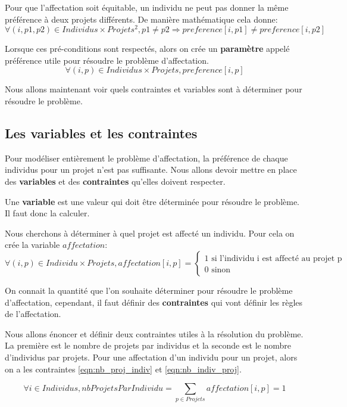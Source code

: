 \documentclass[final,poster]{polytech/polytech}
\begin{document}
Pour que l'affectation soit équitable, un individu ne peut pas donner la même préférence à deux projets différents. De manière mathématique cela donne:
$$
\forall (i,p1,p2) \in Individus \times Projets^2 , p1 \neq p2 \Rightarrow preference[i,p1] \neq preference[i,p2]
$$

Lorsque ces pré-conditions sont respectés, alors on crée un \textbf{paramètre} appelé préférence utile pour résoudre le problème d'affectation.
$$
\forall (i,p) \in Individus \times Projets,
preference[i,p]
$$

Nous allons maintenant voir quels contraintes et variables sont à déterminer pour résoudre le problème.

\subsection{Les variables et les contraintes}

Pour modéliser entièrement le problème d'affectation, la préférence de chaque individus pour un projet n'est pas suffisante.
Nous allons devoir mettre en place des \textbf{ variables} et des \textbf{contraintes} qu'elles doivent respecter.

Une \textbf{variable} est une valeur qui doit être déterminée pour résoudre le problème. Il faut donc la calculer.

Nous cherchons à déterminer à quel projet est affecté un individu. Pour cela on crée la variable $affectation$:
$$
\forall (i,p) \in Individu\times Projets , affectation[i,p]=
\left\lbrace
\begin{array}{l}
1 \text{ si l'individu i est affecté au projet p} \\
0 \text{ sinon}
\end{array}
\right.
$$

On connait la quantité que l'on souhaite déterminer pour résoudre le problème d'affectation, cependant, il faut définir des \textbf{contraintes} qui vont définir les règles de l'affectation.

Nous allons énoncer et définir deux contraintes utiles à la résolution du problème. La première est le nombre de projets par individus et la seconde est le nombre d'individus par projets.
Pour une affectation d'un individu pour un projet, alors on a les contraintes \eqref{eqn:nb_proj_indiv} et \eqref{eqn:nb_indiv_proj}.

\begin{equation}
\label{eqn:nb_proj_indiv}
\forall i \in Individus, nbProjetsParIndividu= \sum_{p \in Projets} affectation[i,p] = 1
\end{equation}
\end{document}
